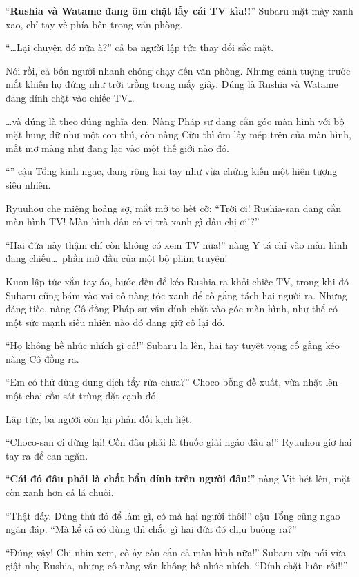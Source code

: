 \documentclass[../main.tex]{subfiles}
\begin{document}
``\textbf{Rushia và Watame đang ôm chặt lấy cái TV kìa!!}'' Subaru mặt mày xanh xao, chỉ tay về phía bên trong văn phòng.

``\dots Lại chuyện đó nữa à?'' cả ba người lập tức thay đổi sắc mặt.

Nói rồi, cả bốn người nhanh chóng chạy đến văn phòng. Nhưng cảnh tượng trước mắt khiến họ đứng như trời trồng trong mấy giây. Đúng là Rushia và Watame đang dính chặt vào chiếc TV\dots

\dots và đúng là theo đúng nghĩa đen. Nàng Pháp sư đang cắn góc màn hình với bộ mặt hung dữ như một con thú, còn nàng Cừu thì ôm lấy mép trên của màn hình, mắt mơ màng như đang lạc vào một thế giới nào đó.


``'' cậu Tổng kinh ngạc, dang rộng hai tay như vừa chứng kiến một hiện tượng siêu nhiên.

Ryuuhou che miệng hoảng sợ, mắt mở to hết cỡ: ``Trời ơi! Rushia-san đang cắn màn hình TV! Màn hình đâu có vị trà xanh gì đâu chị ơi!?''

``Hai đứa này thậm chí còn không có xem TV nữa!'' nàng Y tá chỉ vào màn hình đang chiếu\dots\ phần mở đầu của một bộ phim truyện!

Kuon lập tức xắn tay áo, bước đến để kéo Rushia ra khỏi chiếc TV, trong khi đó Subaru cũng bám vào vai cô nàng tóc xanh để cố gắng tách hai người ra. Nhưng đáng tiếc, nàng Cô đồng Pháp sư vẫn dính chặt vào góc màn hình, như thể có một sức mạnh siêu nhiên nào đó đang giữ cô lại đó.

``Họ không hề nhúc nhích gì cả!'' Subaru la lên, hai tay tuyệt vọng cố gắng kéo nàng Cô đồng ra.

``Em có thử dùng dung dịch tẩy rửa chưa?'' Choco bỗng đề xuất, vừa nhặt lên một chai cồn sát trùng đặt cạnh đó.

Lập tức, ba người còn lại phản đối kịch liệt.

``Choco-san ơi dừng lại! Cồn đâu phải là thuốc giải ngáo đâu ạ!'' Ryuuhou giơ hai tay ra để can ngăn.

``\textbf{Cái đó đâu phải là chất bẩn dính trên người đâu!}'' nàng Vịt hét lên, mặt còn xanh hơn cả lá chuối.

``Thật đấy. Dùng thứ đó để làm gì, có mà hại người thôi!'' cậu Tổng cũng ngao ngán đáp. ``Mà kể cả có dùng thì chắc gì hai đứa đó chịu buông ra?''

``Đúng vậy! Chị nhìn xem, cô ấy còn cắn cả màn hình nữa!'' Subaru vừa nói vừa giật nhẹ Rushia, nhưng cô nàng vẫn không hề nhúc nhích. ``Dính chặt luôn rồi!!''
\end{document}
